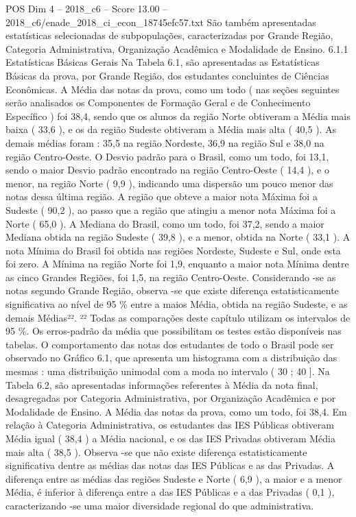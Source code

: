 \begin{textsample}{POS Dim 4 – 2018\_c6 – Score 13.00 – 2018\_c6/enade\_2018\_ci\_econ\_18745efc57.txt}
São também apresentadas estatísticas selecionadas de subpopulações, caracterizadas por Grande Região, Categoria Administrativa, Organização Acadêmica e Modalidade de Ensino. 6.1.1 Estatísticas Básicas Gerais Na Tabela 6.1, são apresentadas as Estatísticas Básicas da prova, por Grande Região, dos estudantes concluintes de Ciências Econômicas.
A Média das notas da prova, como um todo ( nas seções seguintes serão analisados os Componentes de Formação Geral e de Conhecimento Específico ) foi 38,4, sendo que os alunos da região Norte obtiveram a Média mais baixa ( 33,6 ), e os da região Sudeste obtiveram a Média mais alta ( 40,5 ).
As demais médias foram : 35,5 na região Nordeste, 36,9 na região Sul e 38,0 na região Centro-Oeste.
O Desvio padrão para o Brasil, como um todo, foi 13,1, sendo o maior Desvio padrão encontrado na região Centro-Oeste ( 14,4 ), e o menor, na região Norte ( 9,9 ), indicando uma dispersão um pouco menor das notas dessa última região.
A região que obteve a maior nota Máxima foi a Sudeste ( 90,2 ), ao passo que a região que atingiu a menor nota Máxima foi a Norte ( 65,0 ).
A Mediana do Brasil, como um todo, foi 37,2, sendo a maior Mediana obtida na região Sudeste ( 39,8 ), e a menor, obtida na Norte ( 33,1 ).
A nota Mínima do Brasil foi obtida nas regiões Nordeste, Sudeste e Sul, onde esta foi zero.
A Mínima na região Norte foi 1,9, enquanto a maior nota Mínima dentre as cinco Grandes Regiões, foi 1,5, na região Centro-Oeste.
Considerando -se as notas segundo Grande Região, observa -se que existe diferença estatisticamente significativa ao nível de 95 \% entre a maios Média, obtida na região Sudeste, e as demais Médias²². ²² Todas as comparações deste capítulo utilizam os intervalos de 95 \%.
Os erros-padrão da média que possibilitam os testes estão disponíveis nas tabelas.
O comportamento das notas dos estudantes de todo o Brasil pode ser observado no Gráfico 6.1, que apresenta um histograma com a distribuição das mesmas : uma distribuição unimodal com a moda no intervalo ( 30 ; 40 ].
Na Tabela 6.2, são apresentadas informações referentes à Média da nota final, desagregadas por Categoria Administrativa, por Organização Acadêmica e por Modalidade de Ensino.
A Média das notas da prova, como um todo, foi 38,4.
Em relação à Categoria Administrativa, os estudantes das IES Públicas obtiveram Média igual ( 38,4 ) a Média nacional, e os das IES Privadas obtiveram Média mais alta ( 38,5 ).
Observa -se que não existe diferença estatisticamente significativa dentre as médias das notas das IES Públicas e as das Privadas.
A diferença entre as médias das regiões Sudeste e Norte ( 6,9 ), a maior e a menor Média, é inferior à diferença entre a das IES Públicas e a das Privadas ( 0,1 ), caracterizando -se uma maior diversidade regional do que administrativa.

\end{textsample}
